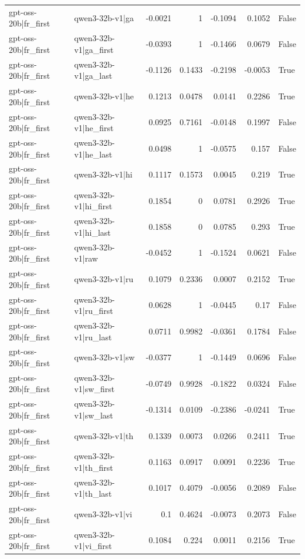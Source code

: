 \begin{table}
\begin{tabular}{l l r r r r l}
gpt-oss-20b|fr_first & qwen3-32b-v1|ga & -0.0021 & 1 & -0.1094 & 0.1052 & False \\
gpt-oss-20b|fr_first & qwen3-32b-v1|ga_first & -0.0393 & 1 & -0.1466 & 0.0679 & False \\
gpt-oss-20b|fr_first & qwen3-32b-v1|ga_last & -0.1126 & 0.1433 & -0.2198 & -0.0053 & True \\
gpt-oss-20b|fr_first & qwen3-32b-v1|he & 0.1213 & 0.0478 & 0.0141 & 0.2286 & True \\
gpt-oss-20b|fr_first & qwen3-32b-v1|he_first & 0.0925 & 0.7161 & -0.0148 & 0.1997 & False \\
gpt-oss-20b|fr_first & qwen3-32b-v1|he_last & 0.0498 & 1 & -0.0575 & 0.157 & False \\
gpt-oss-20b|fr_first & qwen3-32b-v1|hi & 0.1117 & 0.1573 & 0.0045 & 0.219 & True \\
gpt-oss-20b|fr_first & qwen3-32b-v1|hi_first & 0.1854 & 0 & 0.0781 & 0.2926 & True \\
gpt-oss-20b|fr_first & qwen3-32b-v1|hi_last & 0.1858 & 0 & 0.0785 & 0.293 & True \\
gpt-oss-20b|fr_first & qwen3-32b-v1|raw & -0.0452 & 1 & -0.1524 & 0.0621 & False \\
gpt-oss-20b|fr_first & qwen3-32b-v1|ru & 0.1079 & 0.2336 & 0.0007 & 0.2152 & True \\
gpt-oss-20b|fr_first & qwen3-32b-v1|ru_first & 0.0628 & 1 & -0.0445 & 0.17 & False \\
gpt-oss-20b|fr_first & qwen3-32b-v1|ru_last & 0.0711 & 0.9982 & -0.0361 & 0.1784 & False \\
gpt-oss-20b|fr_first & qwen3-32b-v1|sw & -0.0377 & 1 & -0.1449 & 0.0696 & False \\
gpt-oss-20b|fr_first & qwen3-32b-v1|sw_first & -0.0749 & 0.9928 & -0.1822 & 0.0324 & False \\
gpt-oss-20b|fr_first & qwen3-32b-v1|sw_last & -0.1314 & 0.0109 & -0.2386 & -0.0241 & True \\
gpt-oss-20b|fr_first & qwen3-32b-v1|th & 0.1339 & 0.0073 & 0.0266 & 0.2411 & True \\
gpt-oss-20b|fr_first & qwen3-32b-v1|th_first & 0.1163 & 0.0917 & 0.0091 & 0.2236 & True \\
gpt-oss-20b|fr_first & qwen3-32b-v1|th_last & 0.1017 & 0.4079 & -0.0056 & 0.2089 & False \\
gpt-oss-20b|fr_first & qwen3-32b-v1|vi & 0.1 & 0.4624 & -0.0073 & 0.2073 & False \\
gpt-oss-20b|fr_first & qwen3-32b-v1|vi_first & 0.1084 & 0.224 & 0.0011 & 0.2156 & True \\

\end{tabular}
\end{table}
